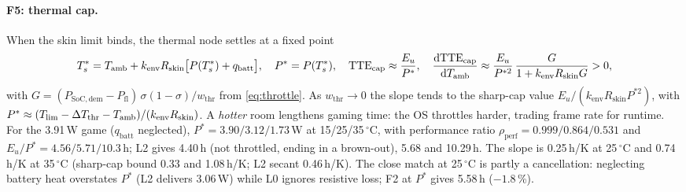 \paragraph{F5: thermal cap.}
When the skin limit binds, the thermal node settles at a fixed point
\begin{equation}
  T_s^*=T_{\mathrm{amb}}+k_{\mathrm{env}}R_{\mathrm{skin}}\big[P(T_s^*)+q_{\mathrm{batt}}\big],\quad P^*=P(T_s^*),\quad
  \mathrm{TTE}_{\mathrm{cap}}\approx\frac{E_u}{P^*},\quad
  \frac{\mathrm{d}\mathrm{TTE}_{\mathrm{cap}}}{\mathrm{d}T_{\mathrm{amb}}}\approx\frac{E_u}{P^{*2}}\,\frac{G}{1+k_{\mathrm{env}}R_{\mathrm{skin}}G}>0, \label{eq:F5}
\end{equation}
with $G=(P_{\mathrm{SoC,dem}}-P_{\mathrm{fl}})\,\sigma(1-\sigma)/w_{\mathrm{thr}}$ from \cref{eq:throttle}. As
$w_{\mathrm{thr}}\to0$ the slope tends to the sharp-cap value $E_u/(k_{\mathrm{env}}R_{\mathrm{skin}}P^{*2})$, with
$P^*\approx(T_{\lim}-\Delta T_{\mathrm{thr}}-T_{\mathrm{amb}})/(k_{\mathrm{env}}R_{\mathrm{skin}})$.
A \emph{hotter} room lengthens gaming time: the OS throttles harder, trading frame rate for
runtime. For the 3.91\,W game ($q_{\mathrm{batt}}$ neglected), $P^*=3.90/3.12/1.73$\,W at 15/25/35\,$^\circ$C,
with performance ratio $\rho_{\mathrm{perf}}=0.999/0.864/0.531$ and $E_u/P^*=4.56/5.71/10.3$\,h; L2 gives
4.40\,h (not throttled, ending in a brown-out), 5.68 and 10.29\,h. The slope is 0.25\,h/K at 25\,$^\circ$C and
0.74\,h/K at 35\,$^\circ$C (sharp-cap bound 0.33 and 1.08\,h/K; L2 secant 0.46\,h/K). The close match at 25\,$^\circ$C is partly a cancellation: neglecting battery
heat overstates $P^*$ (L2 delivers 3.06\,W) while L0 ignores resistive loss; F2 at $P^*$ gives 5.58\,h ($-1.8$\,\%).

